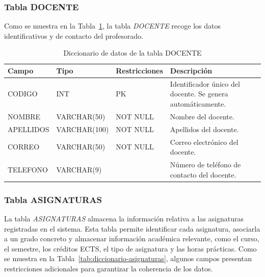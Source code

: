 \subsubsection{Tabla DOCENTE}

Como se muestra en la Tabla~\ref{tab:diccionario-docente}, la tabla \textit{DOCENTE} recoge los datos identificativos y de contacto del profesorado.\\

\begin{table}[H]
	\centering
	\scriptsize
	\setlength{\tabcolsep}{3pt}
	\renewcommand{\arraystretch}{1.15}
	\begin{tabularx}{\textwidth}{@{}
			>{\raggedright\arraybackslash}p{2.6cm}
			>{\raggedright\arraybackslash}p{2.2cm}
			>{\raggedright\arraybackslash}p{2.2cm}
			X@{}}
		\toprule
		\textbf{Campo} & \textbf{Tipo} & \textbf{Restricciones} & \textbf{Descripción} \\
		\midrule
		CODIGO & INT & PK & Identificador único del docente. Se genera automáticamente. \\
		NOMBRE & VARCHAR(50) & NOT NULL & Nombre del docente. \\
		APELLIDOS & VARCHAR(100) & NOT NULL & Apellidos del docente. \\
		CORREO & VARCHAR(50) & NOT NULL & Correo electrónico del docente. \\
		TELEFONO & VARCHAR(9) &  & Número de teléfono de contacto del docente. \\
		\bottomrule
	\end{tabularx}
	\caption{Diccionario de datos de la tabla DOCENTE}
	\label{tab:diccionario-docente}
\end{table}


\subsubsection{Tabla ASIGNATURAS}

 La tabla \textit{ASIGNATURAS} almacena la información relativa a las asignaturas registradas en el sistema. Esta tabla permite identificar cada asignatura, asociarla a un grado concreto y almacenar información académica relevante, como el curso, el semestre, los créditos ECTS, el tipo de asignatura y las horas prácticas. Como se muestra en la Tabla~\ref{tab:diccionario-asignaturas}, algunos campos presentan restricciones adicionales para garantizar la coherencia de los datos.\\

